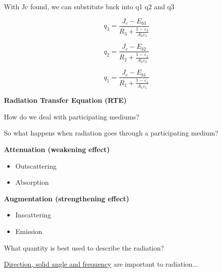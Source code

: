 \documentclass[12pt]{article}
\renewcommand{\_}{\kern-1.5pt\textunderscore\kern-1.5pt}
\begin{document}
With Jc found, we can substitute back into q1 q2 and q3\par

 \[ q_{3}=\frac{J_{c}-E_{b3}}{R_{3}+\frac{1- \varepsilon _{3}}{A_{3} \varepsilon _{3}}} \] \par

 \[ q_{2}=\frac{J_{c}-E_{b2}}{R_{2}+\frac{1- \varepsilon _{2}}{A_{2} \varepsilon _{2}}} \] \par

 \[ q_{1}=\frac{J_{c}-E_{b1}}{R_{1}+\frac{1- \varepsilon _{1}}{A_{1} \varepsilon _{1}}} \] \par


\vspace{\baselineskip}
\textbf{Radiation Transfer Equation (RTE)}\par

\par

How do we deal with participating mediums?\par

So what happens when radiation goes through a participating medium?\par

\textbf{Attenuation (weakening effect)}\par

\begin{itemize}
	\item Outscattering\par

	\item Absorption\par
\end{itemize}


\textbf{Augmentation (strengthening effect)}\par

\begin{itemize}
	\item Inscattering\par

	\item Emission\par
\end{itemize}




\vspace{\baselineskip}
What quantity is best used to describe the radiation?\par

\uline{Direction, solid angle and frequency} are important to radiation$ \ldots $ \par
\end{document}
